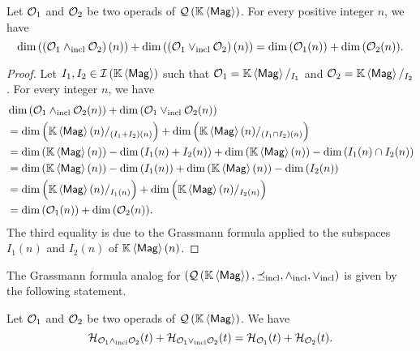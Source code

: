 \begin{Lemma}
    \label{lem:lattice_structure_and_coefficients_of_Hiblert_series}
    Let $\mathcal{O}_1$ and $\mathcal{O}_2$ be two operads of $\mathcal{Q}\left(\mathbb{K} \left\langle\mathsf{Mag}\right\rangle\right)$. For every
    positive integer $n$, we have
    \begin{equation}
    \label{equ:lattice_structure_and_coefficients_of_the_Hiblert_series}
        \dim{\left(\left(\Oca_1\InfQMag\Oca_2\right)(n)\right)}+
        \dim{\left(\left(\Oca_1\SupQMag\Oca_2\right)(n)\right)}=
        \dim{\left(\Oca_1(n)\right)}+\dim{\left(\Oca_2(n)\right)}.
    \end{equation}
\end{Lemma}

\begin{proof}
    Let $I_1, I_2 \in \mathcal{I}\left(\mathbb{K} \left\langle\mathsf{Mag}\right\rangle\right)$ such that $\mathcal{O}_1 = \mathbb{K} \left\langle\mathsf{Mag}\right\rangle/_{I_1}$ and
    $\mathcal{O}_2 = \mathbb{K} \left\langle\mathsf{Mag}\right\rangle/_{I_2}$. For every integer $n$, we have
    \begin{equation}\begin{split}
        &\dim{\left(\mathcal{O}_1\wedge_{\mathrm{incl}}\mathcal{O}_2(n)\right)}+
            \dim{\left(\mathcal{O}_1\vee_{\mathrm{incl}}\mathcal{O}_2(n)\right)}\\
        &=\dim{\Big(\mathbb{K}\left\langle\mathsf{Mag}\right\rangle(n)/_{\left(I_1+I_2\right)(n)}\Big)}+
            \dim{\Big(\mathbb{K}\left\langle\mathsf{Mag}\right\rangle(n)/_{\left(I_1\cap I_2\right)(n)}\Big)}\\
        &=\dim{\left(\mathbb{K}\left\langle\mathsf{Mag}\right\rangle(n)\right)}-\dim{\left(I_1(n)+I_2(n)\right)}
            +\dim{\left(\mathbb{K}\left\langle\mathsf{Mag}\right\rangle(n)\right)}
            -\dim{\left(I_1(n)\cap I_2(n)\right)} \\
        &=\dim{\left(\mathbb{K}\left\langle\mathsf{Mag}\right\rangle(n)\right)}-\dim{\left(I_1(n)\right)}
            + \dim{\left(\mathbb{K}\left\langle\mathsf{Mag}\right\rangle(n)\right)}-\dim{\left(I_2(n)\right)}\\
        &=\dim{\Big(\mathbb{K}\left\langle\mathsf{Mag}\right\rangle(n)/_{I_1(n)}\Big)}
            +\dim{\Big(\mathbb{K}\left\langle\mathsf{Mag}\right\rangle(n)/_{I_2(n)}\Big)}\\
        &=\dim{\left(\mathcal{O}_1(n)\right)}+\dim{\left(\mathcal{O}_2(n)\right)}.
    \end{split}\end{equation}
    The third equality is due to the Grassmann formula applied to the
    subspaces $I_1(n)$ and $I_2(n)$ of $\mathbb{K} \left\langle\mathsf{Mag}\right\rangle(n)$.
\end{proof}
\medbreak

The Grassmann formula analog for $\left(\mathcal{Q}\left(\mathbb{K} \left\langle\mathsf{Mag}\right\rangle\right),\preceq_{\mathrm{incl}},\wedge_{\mathrm{incl}},\vee_{\mathrm{incl}}\right)$ is given by the following
statement.
\medbreak

\begin{Theorem}
    \label{thm:Grassmann_formula_for_Hilbert_series_of_QMag}
    Let $\mathcal{O}_1$ and $\mathcal{O}_2$ be two operads of $\mathcal{Q}\left(\mathbb{K} \left\langle\mathsf{Mag}\right\rangle\right)$. We have
    \begin{equation} \label{equ:lattice_structure_and_Hiblert_series}
        \mathcal{H}_{\mathcal{O}_1\wedge_{\mathrm{incl}}\mathcal{O}_2}(t)
        +\mathcal{H}_{\mathcal{O}_1\vee_{\mathrm{incl}}\mathcal{O}_2}(t)
        =\mathcal{H}_{\mathcal{O}_1}(t)+\mathcal{H}_{\mathcal{O}_2}(t).
    \end{equation}
\end{Theorem}

